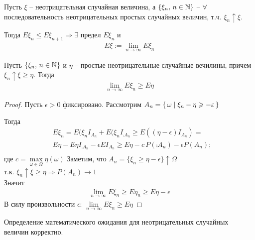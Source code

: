 
\begin{definition}
  Пусть $\xi$ -- неотрицательная случайная величина, 
  а $\{ \xi_n,\, n \in \mathbb{N} \}$ -- $\forall$ последовательность неотрицательных 
  простых случайных величин, т.ч. $\xi_n \uparrow \xi$. 

  Тогда $E \xi_n \leq E \xi_{n + 1} \Rightarrow \exists$ предел $E \xi_n$ и
  \begin{align*}
    E \xi := \lim_{n \to \infty} E \xi_n
  \end{align*}
\end{definition}

\begin{lemma}
  Пусть $\{ \xi_n,\, n \in \mathbb{N} \}$ и $\eta$ -- простые неотрицательные случайные вечилины, 
  причем $\xi_n \uparrow \xi \geq \eta$. Тогда 
  \begin{align*}
    \lim_{n \to \infty} E \xi_n \geq E \eta
  \end{align*}
\end{lemma}

\begin{proof}
  Пусть $\epsilon > 0$ фиксировано. 
  Рассмотрим $A_n = \left\{ \, \omega \mid \xi_n - \eta \geqslant -\varepsilon \, \right\}$

  Тогда
  \begin{align*}
    &E\xi_n = E(\xi_n I_{A_n} + E(\xi_n I_{\comp{A}_n} \geq E((\eta - \epsilon) I_{A_n}) = \\
    &E \eta - E\eta I_{\comp{A}_n} - \epsilon E I_{A_n} \geq 
    E\eta - c\, P(\comp{A}_n) - \epsilon P(A_n);\\
  \end{align*}
  где $c = \max\limits_{\omega \in \Omega} \eta(\omega)$
  Заметим, что $A_n = \{ \xi_n \geq \eta - \epsilon \} \uparrow \Omega$\\
  т.к. $\xi_n \uparrow \xi \geq \eta \Rightarrow P(A_n) \rightarrow 1$\\
  Значит
  \begin{align*}
    \lim_{n \to \infty} E\xi_n \geq E\eta_n \geq E\eta - \epsilon
  \end{align*}
  В силу произвольности $\epsilon$: $\lim\limits_{n \to \infty} E \xi_n \geq E \eta$
\end{proof}

\begin{corollary}
  Определение математического ожидания для неотрицательных случайных величин корректно.
\end{corollary}

